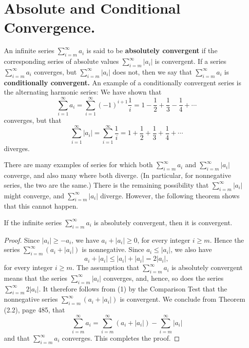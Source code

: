 \section{Absolute and Conditional Convergence.} 
An infinite series $\sum_{i=m}^{\infty} a_i$ is said to be \textbf{absolutely convergent} if the corresponding series of absolute values $\sum_{i=m}^{\infty} |a_i|$ is convergent. If a series $\sum_{i=m}^{\infty} a_i$ converges, but $\sum_{i=m}^{\infty} |a_i|$ does not, then we say that $\sum_{i=m}^{\infty} a_i$ is \textbf{conditionally convergent.} An example of a conditionally convergent series is the alternating harmonic series: We have shown that
$$
\sum_{i=1}^{\infty} a_i = \sum_{i=1}^{\infty} (- 1)^{i+1} \frac{1}{i} = 1 - \frac{1}{2} + \frac{1}{3}  - \frac{1}{4} + \cdots  
$$
\noindent converges, but that
$$
\sum_{i=1}^{\infty} |a_i| = \sum_{i=1}^{\infty} \frac{1}{i} = 1 + \frac{1}{2} + \frac{1}{3} + \frac{1}{4} + \cdots
$$
\noindent diverges.

There are many examples of series for which both $\sum_{i=m}^{\infty} a_i$ and $\sum_{i=m}^{\infty} |a_i|$ converge, and also many where both diverge. (In particular, for nonnegative series, the two are the same.) There is the remaining possibility that $\sum_{i=m}^{\infty} |a_i|$ might converge, and $\sum_{i=m}^{\infty} |a_i|$ diverge. However, the following theorem shows that this cannot happen.

\begin{theorem} If the infinite series $\sum_{i=m}^{\infty} a_i$ is absolutely convergent, then it is convergent.
\end{theorem}

\begin{proof}
Since $|a_i| \geq -a_i$, we have $a_i + |a_i| \geq 0$, for every integer $i \geq m$. Hence the series $\sum_{i=m}^{\infty}  (a_i + |a_i|)$ is nonnegative. Since $a_i \leq |a_i|$, we also have
\begin{equation}
a_i + |a_i| \leq |a_i| + |a_i| = 2|a_i|,  
\label{eq9.5.1}
\end{equation}
for every integer $i \geq m$. The assumption that $\sum_{i=m}^{\infty} a_i$ is absolutely convergent means that the series $\sum_{i=m}^{\infty} |a_i|$ converges, and, hence, so does the series $\sum_{i=m}^{\infty} 2|a_i|$. It therefore follows from (1) by the Comparison Test that the nonnegative series $\sum_{i=m}^{\infty}  (a_i + |a_i|)$ is convergent. We conclude from Theorem (2.2), page 485, that
$$
\sum_{i=m}^{\infty} a_i = \sum_{i=m}^{\infty} (a_i + |a_i |) - \sum_{i=m}^{\infty} |a_i| 
$$
and that $\sum_{i=m}^{\infty} a_i$ converges. This completes the proof.
\end{proof}

